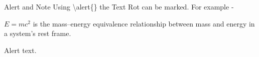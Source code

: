 \begin{frame}{Alert and Note}
	Using \textbackslash alert\{\} the Text \alert{Rot} can be marked. For example -
	\begin{mynote}[Note]  
		$E=mc^2$ is the mass–energy equivalence relationship between mass and energy in a system's rest frame.
	\end{mynote}
	
	\begin{myalert}
		Alert text.
	\end{myalert}
\end{frame}